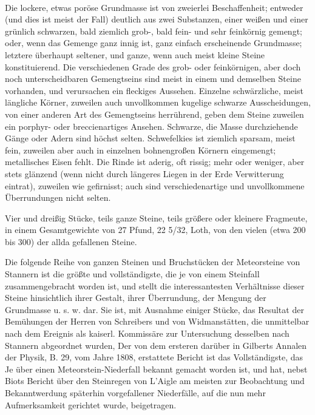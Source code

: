 \documentclass[a4paper, 11pt, oneside, polutonikogreek, german]{article}
\begin{document}
\paragraph{}
Die lockere, etwas poröse Grundmasse ist von zweierlei Beschaffenheit; entweder (und dies ist meist der Fall) deutlich aus zwei Substanzen, einer weißen und einer grünlich schwarzen, bald ziemlich grob-, bald fein- und sehr feinkörnig gemengt; oder, wenn das Gemenge ganz innig ist, ganz einfach erscheinende Grundmasse; letztere überhaupt seltener, und ganze, wenn auch meist kleine Steine konstituierend. Die verschiedenen Grade des grob- oder feinkörnigen, aber doch noch unterscheidbaren Gemengtseins sind meist in einem und demselben Steine vorhanden, und verursachen ein fleckiges Aussehen. Einzelne schwärzliche, meist längliche Körner, zuweilen auch unvollkommen kugelige schwarze Ausscheidungen, von einer anderen Art des Gemengtseins herrührend, geben dem Steine zuweilen ein porphyr- oder breccienartiges Ansehen. Schwarze, die Masse durchziehende Gänge oder Adern sind höchst selten. Schwefelkies ist ziemlich sparsam, meist fein, zuweilen aber auch in einzelnen bohnengroßen Körnern eingemengt; metallisches Eisen fehlt. Die Rinde ist aderig, oft rissig; mehr oder weniger, aber stets glänzend (wenn nicht durch längeres Liegen in der Erde Verwitterung eintrat), zuweilen wie gefirnisst; auch sind verschiedenartige und unvollkommene Überrundungen nicht selten.

Vier und dreißig Stücke, teils ganze Steine, teils größere oder kleinere Fragmeute, in einem Gesamtgewichte von 27 Pfund, 22 5/32, Loth, von den vielen (etwa 200 bis 300) der allda gefallenen Steine.

Die folgende Reihe von ganzen Steinen und Bruchstücken der Meteorsteine von Stannern ist die größte und vollständigste, die je von einem Steinfall zusammengebracht worden ist, und stellt die interessantesten Verhältnisse dieser Steine hinsichtlich ihrer Gestalt, ihrer Überrundung, der Mengung der Grundmasse u. s. w. dar. Sie ist, mit Ausnahme einiger Stücke, das Resultat der Bemühungen der Herren von Schreibers und von Widmanstätten, die unmittelbar nach dem Ereignis als kaiserl. Kommissäre zur Untersuchung desselben nach Stannern abgeordnet wurden, Der von dem ersteren darüber in Gilberts Annalen der Physik, B. 29, vom Jahre 1808, erstattete Bericht ist das Vollständigste, das Je über einen Meteorstein-Niederfall bekannt gemacht worden ist, und hat, nebst Biots Bericht über den Steinregen von L’Aigle am meisten zur Beobachtung und Bekanntwerdung späterhin vorgefallener Niederfälle, auf die nun mehr Aufmerksamkeit gerichtet wurde, beigetragen.
\end{document}
